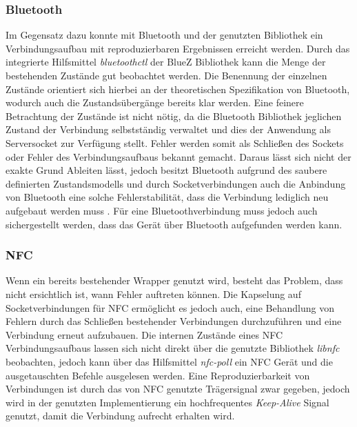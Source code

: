 		\subsubsection{Bluetooth} Im Gegensatz dazu konnte mit Bluetooth und der genutzten Bibliothek ein \linebreak Verbindungsaufbau mit reproduzierbaren Ergebnissen erreicht werden. Durch das integrierte Hilfsmittel {\it bluetoothctl} der BlueZ Bibliothek kann die Menge der bestehenden Zustände gut beobachtet werden. Die Benennung der einzelnen Zustände orientiert sich hierbei an der theoretischen Spezifikation von Bluetooth, wodurch auch die Zustandsübergänge bereits klar werden. Eine feinere Betrachtung der Zustände ist nicht nötig, da die Bluetooth Bibliothek jeglichen Zustand der Verbindung selbstständig verwaltet und dies der Anwendung als Serversocket zur Verfügung stellt. Fehler werden somit als Schließen des Sockets oder Fehler des Verbindungsaufbaus bekannt gemacht. Daraus lässt sich nicht der exakte Grund Ableiten lässt, jedoch besitzt Bluetooth aufgrund des saubere definierten Zustandsmodells und durch Socketverbindungen auch die Anbindung von Bluetooth eine solche Fehlerstabilität, dass die Verbindung lediglich neu aufgebaut werden muss \cite{bluetoothSpec}. Für eine Bluetoothverbindung muss jedoch auch  sichergestellt werden, dass das Gerät über Bluetooth aufgefunden werden kann.
		
          \subsubsection{NFC} Wenn ein bereits bestehender Wrapper genutzt wird, besteht das Problem, dass nicht ersichtlich ist, wann Fehler auftreten können. Die Kapselung auf Socketverbindungen für NFC ermöglicht es jedoch auch, eine Behandlung von Fehlern durch das Schließen bestehender Verbindungen durchzuführen und eine Verbindung erneut aufzubauen. Die internen Zustände eines NFC Verbindungsaufbaus lassen sich nicht direkt über die genutzte Bibliothek {\it libnfc} beobachten, jedoch kann über das Hilfsmittel {\it nfc-poll} ein NFC Gerät und die ausgetauschten Befehle ausgelesen werden. Eine Reproduzierbarkeit von Verbindungen ist durch das von NFC genutzte Trägersignal zwar gegeben, jedoch wird in der genutzten Implementierung ein hochfrequentes {\it Keep-Alive} Signal genutzt, damit die Verbindung aufrecht erhalten wird.
     
